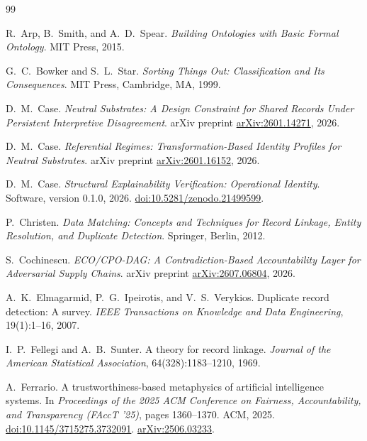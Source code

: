 \documentclass[11pt]{article}
\theoremstyle{plain}
\theoremstyle{definition}
\theoremstyle{remark}
\begin{document}
\begin{thebibliography}{99}
  \small

  R.\ Arp, B.\ Smith, and A.\ D.\ Spear.
  \emph{Building Ontologies with Basic Formal Ontology}.
  MIT Press, 2015.

  G.\ C.\ Bowker and S.\ L.\ Star.
  \emph{Sorting Things Out: Classification and Its Consequences}.
  MIT Press, Cambridge, MA, 1999.

  D.\ M.\ Case.
  \emph{Neutral Substrates: A Design Constraint for Shared Records Under Persistent Interpretive Disagreement}.
  arXiv preprint \href{https://arxiv.org/abs/2601.14271}{arXiv:2601.14271}, 2026.

  D.\ M.\ Case.
  \emph{Referential Regimes: Transformation-Based Identity Profiles for Neutral Substrates}.
  arXiv preprint \href{https://arxiv.org/abs/2601.16152}{arXiv:2601.16152}, 2026.

  D.\ M.\ Case.
  \emph{Structural Explainability Verification: Operational Identity}.
  Software, version 0.1.0, 2026.
  \href{https://doi.org/10.5281/zenodo.21499599}{doi:10.5281/zenodo.21499599}.

  P.\ Christen.
  \emph{Data Matching: Concepts and Techniques for Record Linkage, Entity Resolution, and Duplicate Detection}.
  Springer, Berlin, 2012.

  S.\ Cochinescu.
  \emph{ECO/CPO-DAG: A Contradiction-Based Accountability Layer for Adversarial Supply Chains}.
  arXiv preprint \href{https://arxiv.org/abs/2607.06804}{arXiv:2607.06804}, 2026.

  A.\ K.\ Elmagarmid, P.\ G.\ Ipeirotis, and V.\ S.\ Verykios.
  Duplicate record detection: A survey.
  \emph{IEEE Transactions on Knowledge and Data Engineering}, 19(1):1--16, 2007.

  I.\ P.\ Fellegi and A.\ B.\ Sunter.
  A theory for record linkage.
  \emph{Journal of the American Statistical Association}, 64(328):1183--1210, 1969.

  A.\ Ferrario.
  A trustworthiness-based metaphysics of artificial intelligence systems.
  In \emph{Proceedings of the 2025 ACM Conference on Fairness, Accountability, and Transparency (FAccT '25)}, pages 1360--1370. ACM, 2025.
  \href{https://doi.org/10.1145/3715275.3732091}{doi:10.1145/3715275.3732091}.
  \href{https://arxiv.org/abs/2506.03233}{arXiv:2506.03233}.


\end{thebibliography}
\end{document}
